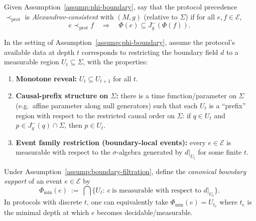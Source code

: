 \begin{definition}\label{def:alex-consistent}
Given Assumption~\ref{assump:phi-boundary}, say that the protocol precedence $\prec_{\mathrm{prot}}$ is \emph{Alexandrov-consistent} with $(M,g)$ (relative to $\Sigma$) if for all $e,f\in\mathcal{E}$,
\[
e\prec_{\mathrm{prot}} f \quad\Rightarrow\quad \Phi(e)\subseteq J^-_g(\Phi(f)).
\]
\end{definition}

\begin{assumption}\label{assump:boundary-filtration}
In the setting of Assumption~\ref{assump:phi-boundary}, assume the protocol's available data at depth \(t\) corresponds to restricting the boundary field \(d\) to a measurable region \(U_t\subseteq \Sigma\), with the properties:
\begin{enumerate}[label=(\roman*),leftmargin=*,itemsep=2pt]
  \item \textbf{Monotone reveal:} \(U_t\subseteq U_{t+1}\) for all \(t\).
  \item \textbf{Causal-prefix structure on \(\Sigma\):} there is a time function/parameter on \(\Sigma\) (e.g.\ affine parameter along null generators) such that each \(U_t\) is a ``prefix'' region with respect to the restricted causal order on \(\Sigma\): if \(q\in U_t\) and \(p\in J^-_g(q)\cap \Sigma\), then \(p\in U_t\).
  \item \textbf{Event family restriction (boundary-local events):} every \(e\in\mathcal{E}\) is measurable with respect to the \(\sigma\)-algebra generated by \(d|_{U_t}\) for some finite \(t\).
\end{enumerate}
\end{assumption}

\begin{definition}\label{def:canonical-boundary-support}
Under Assumption~\ref{assump:boundary-filtration}, define the \emph{canonical boundary support} of an event \(e\in\mathcal{E}\) by
\[
\Phi_{\min}(e)\ :=\ \bigcap\{U_t:\ e\ \text{is measurable with respect to }d|_{U_t}\}.
\]
In protocols with discrete \(t\), one can equivalently take \(\Phi_{\min}(e)=U_{t_e}\) where \(t_e\) is the minimal depth at which \(e\) becomes decidable/measurable.
\end{definition}

